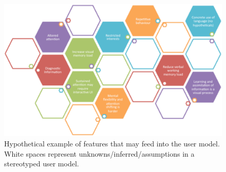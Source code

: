 \documentclass[a4paper, 11pt]{article}
\begin{document}
\begin{justify}
\begin{figure}[H]
\begin{center}
    \includegraphics[scale=0.7]{usermodelconstruct}
    \caption{Hypothetical example of features that may feed into the user model. White spaces represent unknowns/inferred/assumptions in a stereotyped user model.}
    \label{usermodelconstruct}
\end{center}
\end{figure}



\end{justify}
\end{document}
